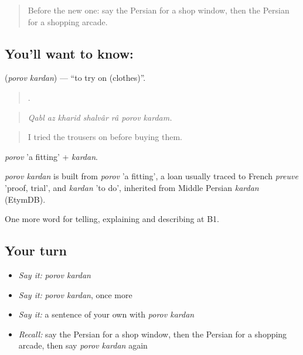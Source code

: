 \label{lesson:FA-C460-porov-kardan}



\begin{quote}
Before the new one: say the Persian for a shop window, then the Persian for a shopping arcade.
\end{quote}

\subsection*{You'll want to know:  }
\textbf{ } (\emph{porov kardan}) — \textquotedblleft{}to try on (clothes)\textquotedblright{}.

\begin{quote}
      .
\end{quote}

\begin{quote}
\emph{Qabl az kharid shalvâr râ porov kardam.}
\end{quote}

\begin{quote}
I tried the trousers on before buying them.
\end{quote}

\emph{porov} 'a fitting' + \emph{kardan}.

\begin{cousinweb}
\emph{porov kardan} is built from \emph{porov} 'a fitting', a loan usually traced to French \emph{preuve} 'proof, trial', and \emph{kardan} 'to do', inherited from Middle Persian \emph{kardan} (EtymDB).
\end{cousinweb}

\begin{grammarlens}[title={What you've built}]
One more word for telling, explaining and describing at B1.
\end{grammarlens}

\subsection*{Your turn}
\begin{itemize}
\raggedright
  \item \emph{Say it:} \emph{porov kardan}
  \item \emph{Say it:} \emph{porov kardan}, once more
  \item \emph{Say it:} a sentence of your own with \emph{porov kardan}
  \item \emph{Recall:} say the Persian for a shop window, then the Persian for a shopping arcade, then say \emph{porov kardan} again
\end{itemize}

